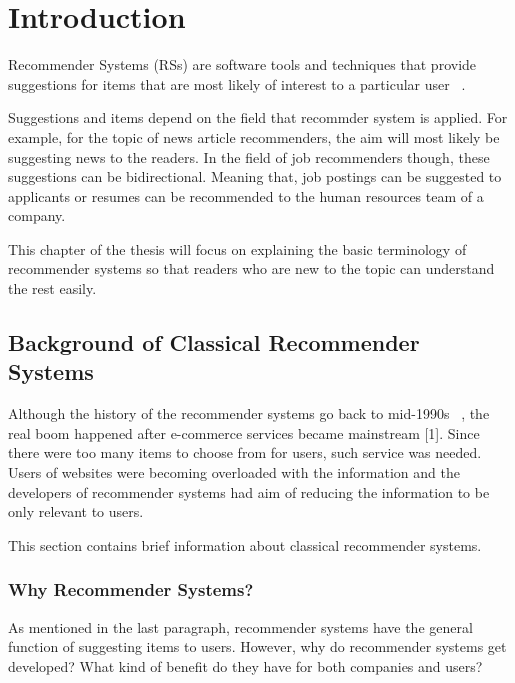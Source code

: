 \renewcommand\textbullet{\ensuremath{\bullet}}

\chapter{Introduction}\label{chapter:introduction}

Recommender Systems (RSs) are software tools and techniques that provide suggestions for items that are most likely of interest to a particular user ~\parencite{Ricci2015}. 

Suggestions and items depend on the field that recommder system is applied. For example, for the topic of news article recommenders, the aim will most likely be suggesting news to the readers. In the field of job recommenders though, these suggestions can be bidirectional. Meaning that, job postings can be suggested to applicants or resumes can be recommended to the human resources team of a company.

This chapter of the thesis will focus on explaining the basic terminology of recommender systems so that readers who are new to the topic can understand the rest easily.

\section{Background of Classical Recommender Systems}

Although the history of the recommender systems go back to mid-1990s ~\parencite{PARK201210059}, the real boom happened after e-commerce services became mainstream [1]. Since there were too many items to choose from for users, such service was needed. Users of websites were becoming overloaded with the information and the developers of recommender systems had aim of reducing the information to be only relevant to users. 

This section contains brief information about classical recommender systems.

\subsection{Why Recommender Systems?}

As mentioned in the last paragraph, recommender systems have the general function of suggesting items to users. However, why do recommender systems get developed? What kind of benefit do they have for both companies and users?

